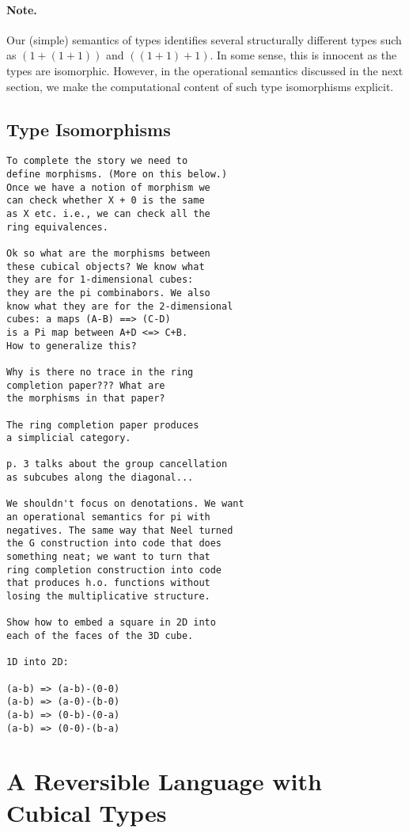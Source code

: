 \documentclass[authoryear,preprint]{sigplanconf}
\begin{document}
\paragraph*{Note.} 
Our (simple) semantics of types identifies several structurally different
types such as $(1+(1+1))$ and $((1+1)+1)$. In some sense, this is innocent as
the types are isomorphic. However, in the operational semantics discussed in
the next section, we make the computational content of such type isomorphisms
explicit.

\subsection{Type Isomorphisms}

\begin{verbatim}
To complete the story we need to 
define morphisms. (More on this below.)
Once we have a notion of morphism we 
can check whether X + 0 is the same
as X etc. i.e., we can check all the 
ring equivalences. 

Ok so what are the morphisms between 
these cubical objects? We know what
they are for 1-dimensional cubes: 
they are the pi combinabors. We also
know what they are for the 2-dimensional 
cubes: a maps (A-B) ==> (C-D) 
is a Pi map between A+D <=> C+B. 
How to generalize this? 

Why is there no trace in the ring 
completion paper??? What are 
the morphisms in that paper?

The ring completion paper produces
a simplicial category.

p. 3 talks about the group cancellation
as subcubes along the diagonal... 

We shouldn't focus on denotations. We want
an operational semantics for pi with 
negatives. The same way that Neel turned
the G construction into code that does
something neat; we want to turn that 
ring completion construction into code
that produces h.o. functions without
losing the multiplicative structure.

Show how to embed a square in 2D into
each of the faces of the 3D cube.

1D into 2D:

(a-b) => (a-b)-(0-0)
(a-b) => (a-0)-(b-0)
(a-b) => (0-b)-(0-a)
(a-b) => (0-0)-(b-a)

\end{verbatim}

\section{A Reversible Language with Cubical Types} 
\end{document}
